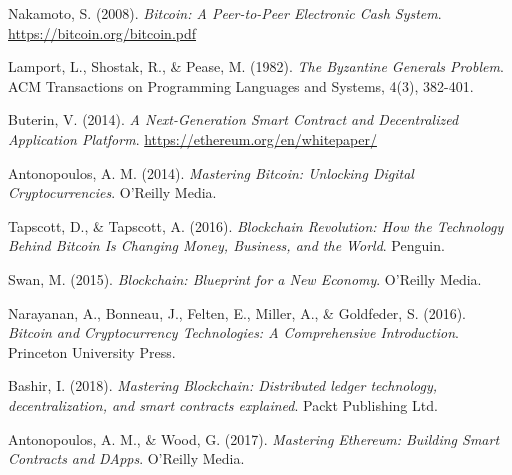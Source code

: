 \documentclass[12pt]{report}
\begin{document}
\begin{thebibliography}{9}

Nakamoto, S. (2008). \textit{Bitcoin: A Peer-to-Peer Electronic Cash System}. \url{https://bitcoin.org/bitcoin.pdf}

Lamport, L., Shostak, R., \& Pease, M. (1982). \textit{The Byzantine Generals Problem}. ACM Transactions on Programming Languages and Systems, 4(3), 382-401.

Buterin, V. (2014). \textit{A Next-Generation Smart Contract and Decentralized Application Platform}. \url{https://ethereum.org/en/whitepaper/}

Antonopoulos, A. M. (2014). \textit{Mastering Bitcoin: Unlocking Digital Cryptocurrencies}. O'Reilly Media.

Tapscott, D., \& Tapscott, A. (2016). \textit{Blockchain Revolution: How the Technology Behind Bitcoin Is Changing Money, Business, and the World}. Penguin.

Swan, M. (2015). \textit{Blockchain: Blueprint for a New Economy}. O'Reilly Media.

Narayanan, A., Bonneau, J., Felten, E., Miller, A., \& Goldfeder, S. (2016). \textit{Bitcoin and Cryptocurrency Technologies: A Comprehensive Introduction}. Princeton University Press.

Bashir, I. (2018). \textit{Mastering Blockchain: Distributed ledger technology, decentralization, and smart contracts explained}. Packt Publishing Ltd.

Antonopoulos, A. M., \& Wood, G. (2017). \textit{Mastering Ethereum: Building Smart Contracts and DApps}. O'Reilly Media.

\end{thebibliography}
\end{document}

